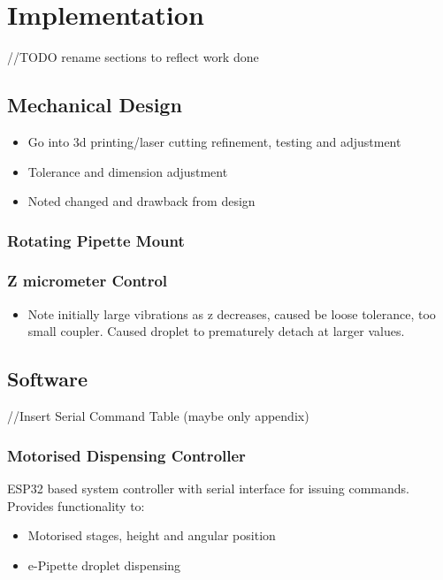 \chapter{Implementation}\label{C:imp} 


//TODO rename sections to reflect work done
\section{Mechanical Design}

\begin{itemize}
    \item Go into 3d printing/laser cutting refinement, testing and adjustment
    \item Tolerance and dimension adjustment
    \item Noted changed and drawback from design  
\end{itemize}

\subsection{Rotating Pipette Mount}

\subsection{Z micrometer Control}
\begin{itemize}
    \item Note initially large vibrations as z decreases, caused be loose tolerance, too small coupler. Caused droplet to prematurely detach at larger values.  
\end{itemize}

\section{Software}

//Insert Serial Command Table (maybe only appendix)

\subsection{Motorised Dispensing Controller}
ESP32 based system controller with serial interface for issuing commands. Provides functionality to:
\begin{itemize}
    \item Motorised stages, height and angular position
    \item e-Pipette droplet dispensing 
\end{itemize}

